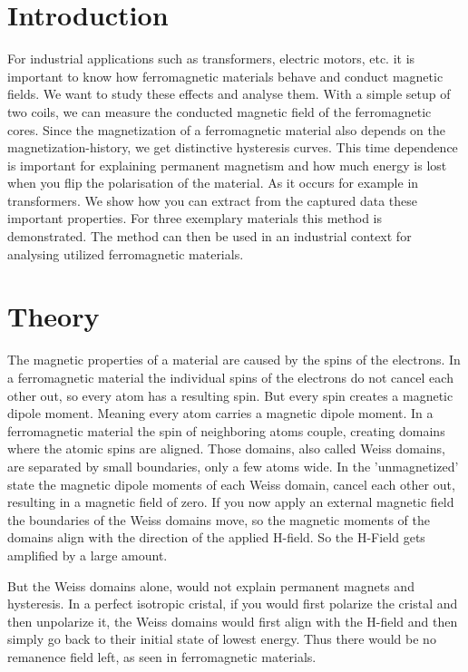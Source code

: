 \documentclass[a4paper,10pt,twocolumn]{article}
\begin{document}
    \section{Introduction}
    
    For industrial applications such as transformers, electric motors, etc. it is important to know how ferromagnetic
    materials behave and conduct magnetic fields.
    We want to study these effects and analyse them.
    With a simple setup of two coils, we can measure the conducted magnetic field of the ferromagnetic cores.
    Since the magnetization of a ferromagnetic material also depends on the magnetization-history, we get distinctive hysteresis curves.
    This time dependence is important for explaining permanent magnetism and how much energy is lost when you flip the
    polarisation of the material.
    As it occurs for example in transformers.
    We show how you can extract from the captured data these important properties.
    For three exemplary materials this method is demonstrated.
    The method can then be used in an industrial context for analysing utilized ferromagnetic materials.
    
    \section{Theory}
    \label{sec:Theory}
    
    The magnetic properties of a material are caused by the spins of the electrons.
    In a ferromagnetic material the individual spins of the electrons do not cancel each other out, so every atom has a
    resulting spin.
    But every spin creates a magnetic dipole moment.
    Meaning every atom carries a magnetic dipole moment.
    In a ferromagnetic material the spin of neighboring atoms couple,
    creating domains where the atomic spins are aligned. 
    Those domains, also called Weiss domains, are separated by small boundaries, only a few atoms wide\cite{feymanLecturesWeisDomains}.
    In the 'unmagnetized' state the magnetic dipole moments of each Weiss domain, cancel each other out, resulting in
    a magnetic field of zero.
    If you now apply an external magnetic field the boundaries of the Weiss domains move, so the magnetic moments of the
    domains align with the direction of the applied H-field.
    So the H-Field gets amplified by a large amount.
    
    But the Weiss domains alone, would not explain permanent magnets and hysteresis. 
    In a perfect isotropic cristal, if you would first polarize the cristal and then unpolarize it, 
    the Weiss domains would first align with the H-field and then simply go back to their initial state of lowest energy.
    Thus there would be no remanence field left, as seen in ferromagnetic materials.
    
\end{document}
